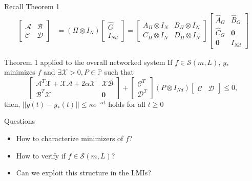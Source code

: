 \documentclass{beamer}
\begin{document}
\begin{frame}{Recall Theorem 1}
	\begin{equation*}
	\begin{split}
		\left[\begin{array}{c|c}
			\mathcal{A}     &  \mathcal{B}\\
			\hline
			\mathcal{C}     &  \mathcal{D}
		\end{array}\right]&=
		(\Pi \otimes I_N)\begin{bmatrix}
			\hat{G}\\
			I_{Nd}
		\end{bmatrix}
		=
		\left[
		\begin{array}{c|c}
			A_{\Pi} \otimes I_{N} & B_{\Pi} \otimes I_{N} \\
			\hline
			C_{\Pi} \otimes I_{N} & D_{\Pi} \otimes I_{N}
		\end{array}
		\right]\left[\begin{array}{c|c}
			\hat{A}_G     &  \hat{B}_G\\
			\hline		
			\hat{C}_G     &  \mathbf{0} \\
			\mathbf{0}     			&  I_{Nd}
		\end{array}\right]
	\end{split}
	\end{equation*}
\pause 
\begin{block}{Theorem 1 applied to the overall networked system}
	If $f\in \mathcal{S}(m,L)$, $y_*$ minimizes $f$ and $\exists \mathcal{X}>0,P \in \mathbb{P}$ such that
	\begin{equation*}%
		\begin{bmatrix}
			\mathcal{A}^T\mathcal{X}+\mathcal{X}\mathcal{A}+2\alpha \mathcal{X}  & \mathcal{X}\mathcal{B} \\
			\mathcal{B}^T\mathcal{X}    & \mathbf{0}
		\end{bmatrix}
		+
		\begin{bmatrix}
			\mathcal{C}^T \\
			\mathcal{D}^T 
		\end{bmatrix}
		( P\otimes I_{Nd})
		\begin{bmatrix}
			\mathcal{C} & \mathcal{D} 
		\end{bmatrix}
		\leq 
		0,
	\end{equation*}
	then, $||y(t)-y_*(t)||\leq \kappa e^{-\alpha t}$ holds for all $t\geq 0$
\end{block}
\pause 
\begin{block}{Questions}
\begin{itemize}
	\item[1] How to characterize minimizers of $f$?
	\item[2] How to verify if $f\in \mathcal{S}(m,L)$?
	\item[3] Can we exploit this structure in the LMIs?   
\end{itemize}
\end{block}
\end{frame}
\end{document}
